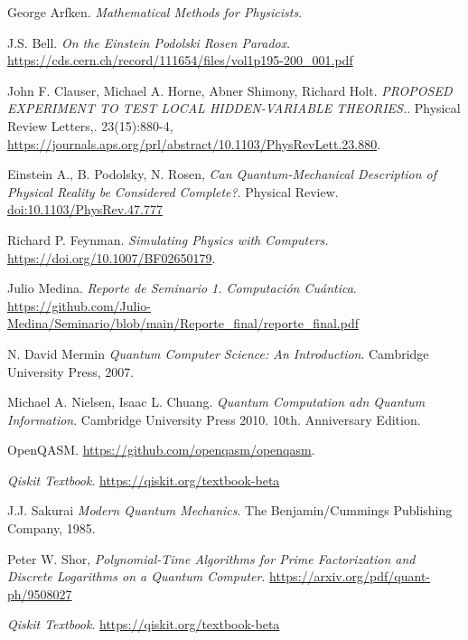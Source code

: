 \documentclass[a4paper]{article}
\begin{document}
\begin{thebibliography}{99}
 George Arfken. \textit{Mathematical Methods for Physicists}.

 J.S. Bell. \textit{On the Einstein Podolski Rosen Paradox}. \url{https://cds.cern.ch/record/111654/files/vol1p195-200_001.pdf}

 John F. Clauser, Michael A. Horne, Abner Shimony, Richard Holt. \textit{PROPOSED EXPERIMENT TO TEST LOCAL HIDDEN-VARIABLE THEORIES.}. Physical Review Letters,. 23(15):880-4, \url{https://journals.aps.org/prl/abstract/10.1103/PhysRevLett.23.880}.

 Einstein A., B. Podolsky, N. Rosen, \textit{Can Quantum-Mechanical Description of Physical Reality be Considered Complete?}. Physical Review. \url{doi:10.1103/PhysRev.47.777}

 Richard P. Feynman. \textit{Simulating Physics with Computers.} \url{https://doi.org/10.1007/BF02650179}.

 Julio Medina. \textit{Reporte de Seminario 1. Computación Cuántica}. \url{https://github.com/Julio-Medina/Seminario/blob/main/Reporte_final/reporte_final.pdf}

 N. David Mermin \textit{Quantum Computer Science: An Introduction}. Cambridge University Press, 2007.

 Michael A. Nielsen, Isaac L. Chuang. \textit{Quantum Computation adn Quantum Information}. Cambridge University Press 2010. 10th. Anniversary Edition.


 OpenQASM. \url{https://github.com/openqasm/openqasm}.

 \textit{Qiskit Textbook}. \url{https://qiskit.org/textbook-beta}


 J.J. Sakurai \textit{Modern Quantum Mechanics}. The Benjamin/Cummings Publishing Company, 1985.

 Peter W. Shor, \textit{Polynomial-Time Algorithms for Prime Factorization and Discrete Logarithms on a Quantum Computer}. \url{https://arxiv.org/pdf/quant-ph/9508027}





 


 \textit{Qiskit Textbook}. \url{https://qiskit.org/textbook-beta}

\end{thebibliography}
\end{document}
